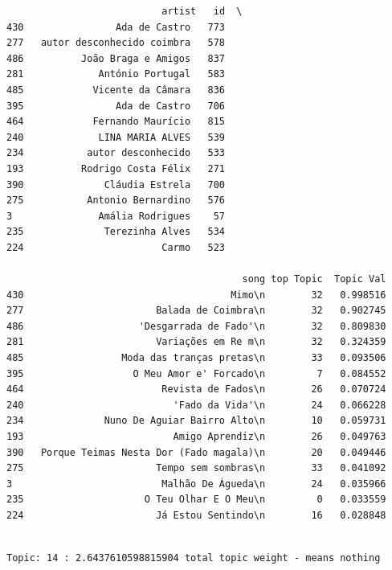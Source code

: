 \documentclass[11pt]{article}
\begin{document}
    
    \begin{verbatim}
                           artist   id  \
430                Ada de Castro   773   
277   autor desconhecido coimbra   578   
486          João Braga e Amigos   837   
281             António Portugal   583   
485            Vicente da Câmara   836   
395                Ada de Castro   706   
464            Fernando Maurício   815   
240             LINA MARIA ALVES   539   
234           autor desconhecido   533   
193          Rodrigo Costa Félix   271   
390              Cláudia Estrela   700   
275           Antonio Bernardino   576   
3               Amália Rodrigues    57   
235              Terezinha Alves   534   
224                        Carmo   523   

                                         song top Topic  Topic Val  
430                                    Mimo\n        32   0.998516  
277                       Balada de Coimbra\n        32   0.902745  
486                    'Desgarrada de Fado'\n        32   0.809830  
281                       Variações em Re m\n        32   0.324359  
485                 Moda das tranças pretas\n        33   0.093506  
395                   O Meu Amor e' Forcado\n         7   0.084552  
464                        Revista de Fados\n        26   0.070724  
240                          'Fado da Vida'\n        24   0.066228  
234              Nuno De Aguiar Bairro Alto\n        10   0.059731  
193                          Amigo Aprendiz\n        26   0.049763  
390   Porque Teimas Nesta Dor (Fado magala)\n        20   0.049446  
275                       Tempo sem sombras\n        33   0.041092  
3                          Malhão De Águeda\n        24   0.035966  
235                     O Teu Olhar E O Meu\n         0   0.033559  
224                       Já Estou Sentindo\n        16   0.028848  
    \end{verbatim}

    
    \begin{Verbatim}[commandchars=\\\{\}]

Topic: 14 : 2.6437610598815904 total topic weight - means nothing

    \end{Verbatim}
\end{document}
